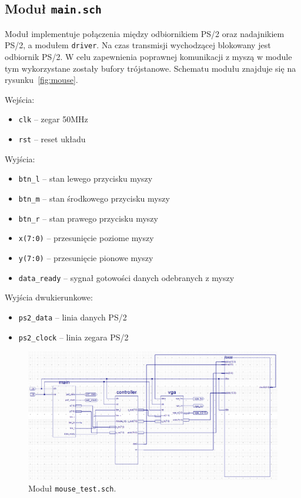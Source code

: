 \subsection{Moduł \texttt{main.sch}}
Moduł implementuje połączenia między odbiornikiem PS/2 oraz nadajnikiem PS/2, a
modułem \texttt{driver}. Na czas transmisji wychodzącej blokowany jest odbiornik
PS/2. W celu zapewnienia poprawnej komunikacji z myszą w module tym wykorzystane
zostały bufory trójstanowe. Schematu modułu znajduje się na
rysunku~\ref{fig:mouse}.
\vspace{1em}

Wejścia:
\begin{itemize}
  \item \texttt{clk} -- zegar 50MHz
  \item \texttt{rst} -- reset układu
\end{itemize}
\vspace{1em}
Wyjścia:
\begin{itemize}
  \item \texttt{btn\_l} -- stan lewego przycisku myszy
  \item \texttt{btn\_m} -- stan środkowego przycisku myszy
  \item \texttt{btn\_r} -- stan prawego przycisku myszy
  \item \texttt{x(7:0)} -- przesunięcie poziome myszy
  \item \texttt{y(7:0)} -- przesunięcie pionowe myszy
  \item \texttt{data\_ready} -- sygnał gotowości danych odebranych z myszy
\end{itemize}
\vspace{1em}
Wyjścia dwukierunkowe:
\begin{itemize}
  \item \texttt{ps2\_data} -- linia danych PS/2
  \item \texttt{ps2\_clock} -- linia zegara PS/2
\end{itemize}

\newpage
\begin{landscape}
\begin{figure}[h!]
\begin{center}
\includegraphics[scale=.45]{main.png}
\caption{Moduł \texttt{mouse\_test.sch}.}
\label{fig:main}
\end{center}
\end{figure}
\end{landscape}
\newpage

